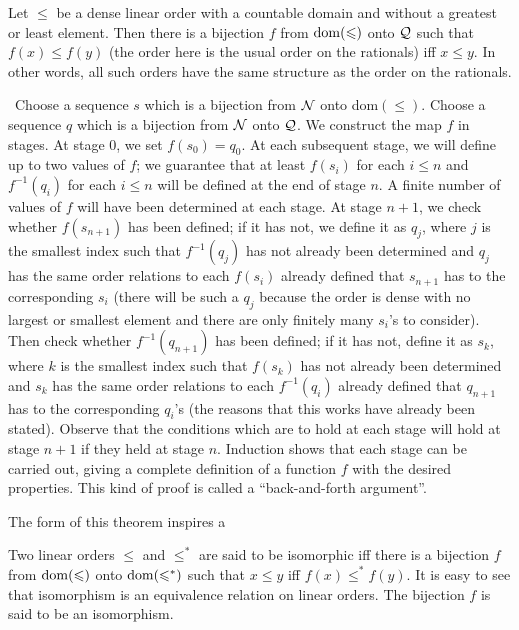 \begin{thm}
 Let $\leq$ be a dense linear order with a countable
 domain and without a greatest or least element.  Then there is a
 bijection $f$ from $\mathop{\mathrm{dom}}(\leqslant)$ onto $\cal Q$ such that $f(x)
 \leq f(y)$ (the order here is the usual order on the rationals) iff $x \leq
 y$.  In other words, all such orders have the same structure as the
 order on the rationals.
\end{thm}

\preuve\ Choose a sequence $s$ which is a bijection from $\cal
N$ onto dom$(\leq)$.  Choose a sequence $q$ which is a bijection from
$\cal N$ onto $\cal Q$.  We construct the map $f$ in stages.  At stage
0, we set $f(s_0) = q_0$.  At each subsequent stage, we will define up
to two values of $f$; we guarantee that at least $f(s_i)$ for each $i
\leq n$ and $f^{-1}(q_i)$ for each $i \leq n$ will be defined at the end of
stage $n$.  A finite number of values of $f$ will have been determined at each
stage.  At stage $n+1$, we check whether $f(s_{n+1})$ has been defined; if it
has not, we define it as $q_j$, where $j$ is the smallest index such that
$f^{-1}(q_j)$ has not already been determined and $q_j$ has the same order
relations to each $f(s_i)$ already defined that $s_{n+1}$ has to the
corresponding $s_i$ (there will be such a $q_j$ because the order is dense with
no largest or smallest element and there are only finitely many $s_i$'s to
consider).  Then check whether $f^{-1}(q_{n+1})$ has been defined; if it has
not, define it as $s_k$, where $k$ is the smallest index such that $f(s_k)$ has
not already been determined and $s_k$ has the same order relations to each
$f^{-1}(q_i)$ already defined that $q_{n+1}$ has to the corresponding $q_i$'s
(the reasons that this works have already been stated).  Observe that the
conditions which are to hold at each stage will hold at stage $n+1$ if they
held at stage $n$.  Induction shows that each stage can be carried out, giving
a complete definition of a function $f$ with the desired properties.  This kind
of proof is called a ``back-and-forth argument''. 
\finpreuve

The form of this theorem inspires a

\begin{definition}
 Two linear orders $\leq$ and $\leq^*$ are said to
 be {\upshape isomorphic} iff there is a bijection $f$ from
 $\mathop{\mathrm{dom}}(\leqslant)$ onto $\mathop{\mathrm{dom}}(\leqslant^*)$ such that $x \leq y$ iff $f(x) \leq^* f(y)$.
 It is easy to see that isomorphism is an equivalence
 relation on linear 
 orders.  The bijection $f$ is said to be an {\upshape isomorphism}.
\end{definition}

